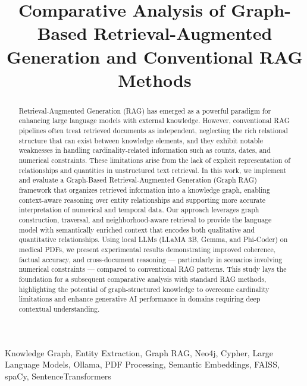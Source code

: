 \documentclass[conference]{IEEEtran}
\begin{document}
\title{Comparative Analysis of Graph-Based Retrieval-Augmented Generation and Conventional RAG Methods}

\author{
    \and
}


\maketitle

\begin{abstract}
Retrieval-Augmented Generation (RAG) has emerged as a powerful paradigm for enhancing large language models with external knowledge. However, conventional RAG pipelines often treat retrieved documents as independent, neglecting the rich relational structure that can exist between knowledge elements, and they exhibit notable weaknesses in handling cardinality-related information such as counts, dates, and numerical constraints. These limitations arise from the lack of explicit representation of relationships and quantities in unstructured text retrieval. In this work, we implement and evaluate a Graph-Based Retrieval-Augmented Generation (Graph RAG) framework that organizes retrieved information into a knowledge graph, enabling context-aware reasoning over entity relationships and supporting more accurate interpretation of numerical and temporal data. Our approach leverages graph construction, traversal, and neighborhood-aware retrieval to provide the language model with semantically enriched context that encodes both qualitative and quantitative relationships. Using local LLMs (LLaMA 3B, Gemma, and Phi-Coder) on medical PDFs, we present experimental results demonstrating improved coherence, factual accuracy, and cross-document reasoning — particularly in scenarios involving numerical constraints — compared to conventional RAG patterns. This study lays the foundation for a subsequent comparative analysis with standard RAG methods, highlighting the potential of graph-structured knowledge to overcome cardinality limitations and enhance generative AI performance in domains requiring deep contextual understanding.
\end{abstract}

\begin{IEEEkeywords}
Knowledge Graph, Entity Extraction, Graph RAG, Neo4j, Cypher, Large Language Models, Ollama, PDF Processing, Semantic Embeddings, FAISS, spaCy, SentenceTransformers
\end{IEEEkeywords}
\end{document}
